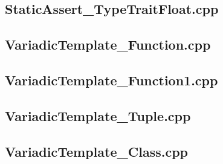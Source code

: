 \documentclass[11pt]{report}
\begin{document}
\begin{appendix}
\subsection{StaticAssert\_TypeTraitFloat.cpp}
\label{StaticAssert_TypeTraitFloat}


\subsection{VariadicTemplate\_Function.cpp}
\label{VariadicTemplate_Function}


\subsection{VariadicTemplate\_Function1.cpp}
\label{VariadicTemplate_Function1}


\subsection{VariadicTemplate\_Tuple.cpp}
\label{VariadicTemplate_Tuple}


\subsection{VariadicTemplate\_Class.cpp}
\label{VariadicTemplate_Class}



\end{appendix}
\end{document}
